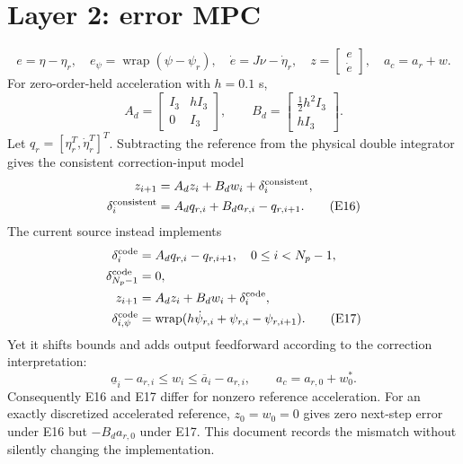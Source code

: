 \documentclass[11pt,a4paper]{article}
\newcommand{\wrap}{\operatorname{wrap}}
\begin{document}
\section{Layer 2: error MPC}
\begin{equation}
e=\eta-\eta_r,\quad e_\psi=\wrap(\psi-\psi_r),\quad
\dot e=J\nu-\dot\eta_r,\quad z=\begin{bmatrix}e\\\dot e\end{bmatrix},\quad
a_c=a_r+w.\tag{E14}
\end{equation}
For zero-order-held acceleration with $h=0.1$ s,
\begin{equation}
A_d=\begin{bmatrix}I_3&hI_3\\0&I_3\end{bmatrix},\qquad
B_d=\begin{bmatrix}\frac12h^2I_3\\hI_3\end{bmatrix}.\tag{E15}
\end{equation}
Let $q_r=[\eta_r^T,\dot\eta_r^T]^T$. Subtracting the reference from the
physical double integrator gives the consistent correction-input model
\begin{align}
z_{i+1}&=A_dz_i+B_dw_i+\delta_i^{\mathrm{consistent}},\notag\\
\delta_i^{\mathrm{consistent}}&=A_dq_{r,i}+B_da_{r,i}-q_{r,i+1}.\tag{E16}
\end{align}
The current source instead implements
\begin{align}
\delta_i^{\mathrm{code}}&=A_dq_{r,i}-q_{r,i+1},\quad0\le i<N_p-1,\notag\\
\delta_{N_p-1}^{\mathrm{code}}&=0,\notag\\
z_{i+1}&=A_dz_i+B_dw_i+\delta_i^{\mathrm{code}},\notag\\
\delta_{i,\psi}^{\mathrm{code}}&=\wrap(h\dot\psi_{r,i}+\psi_{r,i}-\psi_{r,i+1}).
\tag{E17}
\end{align}
Yet it shifts bounds and adds output feedforward according to the correction
interpretation:
\begin{equation}
\underline a_i-a_{r,i}\le w_i\le\overline a_i-a_{r,i},\qquad
a_c=a_{r,0}+w_0^*.\tag{E18}
\end{equation}
Consequently E16 and E17 differ for nonzero reference acceleration. For an
exactly discretized accelerated reference, $z_0=w_0=0$ gives zero next-step
error under E16 but $-B_da_{r,0}$ under E17. This document records the mismatch
without silently changing the implementation.
\end{document}
